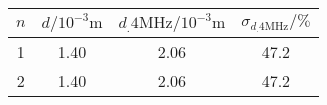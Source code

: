 \label{tab:tabAScan4MHzFehler}
	\begin{tabular}{S[table-format=1.0]S[table-format=2.2]S[table-format=2.2]S[table-format=2.1]}
		\toprule
		{$n$} & {$d/10^{-3}\si{\metre}$} & {$d_.{4\si{\mega\hertz}}/10^{-3}\si{\metre}$} & {$\sigma_{d_.{4\si{\mega\hertz}}}/\%$} \\
		 & 1.40 & 2.06 & 47.2 \\
		2 & 1.40 & 2.06 & 47.2 \\
		\bottomrule
	\end{tabular}
